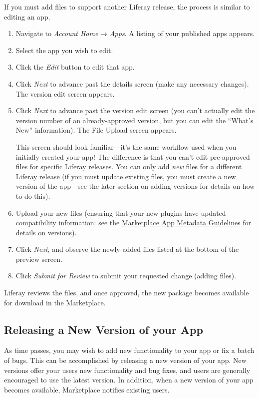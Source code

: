 If you must add files to support another Liferay release, the process is
similar to editing an app.

\begin{enumerate}
\def\labelenumi{\arabic{enumi}.}
\item
  Navigate to \emph{Account Home} → \emph{Apps}. A listing of your
  published apps appears.
\item
  Select the app you wish to edit.
\item
  Click the \emph{Edit} button to edit that app.
\item
  Click \emph{Next} to advance past the details screen (make any
  necessary changes). The version edit screen appears.
\item
  Click \emph{Next} to advance past the version edit screen (you can't
  actually edit the version number of an already-approved version, but
  you can edit the ``What's New'' information). The File Upload screen
  appears.

  This screen should look familiar---it's the same workflow used when
  you initially created your app! The difference is that you can't edit
  pre-approved files for specific Liferay releases. You can only add
  \emph{new} files for a different Liferay release (if you must update
  existing files, you must create a new version of the app---see the
  later section on adding versions for details on how to do this).
\item
  Upload your new files (ensuring that your new plugins have updated
  compatibility information: see the
  \href{/how-to-publish/-/knowledge_base/publish/preparing-your-app}{Marketplace
  App Metadata Guidelines} for details on versions).
\item
  Click \emph{Next}, and observe the newly-added files listed at the
  bottom of the preview screen.
\item
  Click \emph{Submit for Review} to submit your requested change (adding
  files).
\end{enumerate}

Liferay reviews the files, and once approved, the new package becomes
available for download in the Marketplace.

\subsection{Releasing a New Version of your
App}\label{releasing-a-new-version-of-your-app}

As time passes, you may wish to add new functionality to your app or fix
a batch of bugs. This can be accomplished by releasing a new version of
your app. New versions offer your users new functionality and bug fixes,
and users are generally encouraged to use the latest version. In
addition, when a new version of your app becomes available, Marketplace
notifies existing users.


